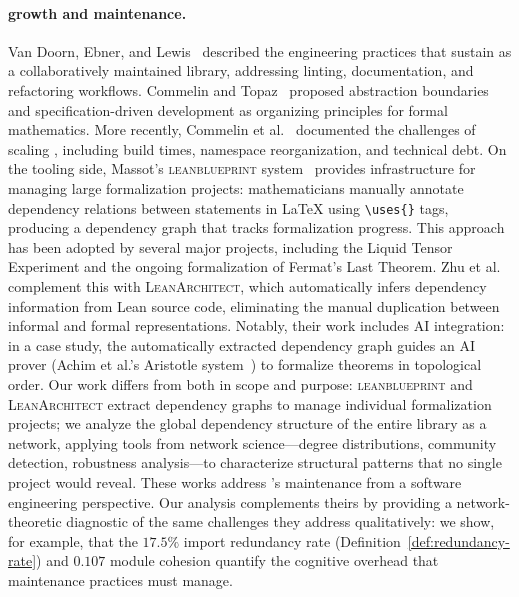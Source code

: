 \paragraph{ growth and maintenance.}
Van Doorn, Ebner, and Lewis~\cite{vandoorn2020} described the engineering practices that sustain  as a collaboratively maintained library, addressing linting, documentation, and refactoring workflows. Commelin and Topaz~\cite{commelin2023} proposed abstraction boundaries and specification-driven development as organizing principles for formal mathematics. More recently, Commelin et al.~\cite{baanen2025} documented the challenges of scaling , including build times, namespace reorganization, and technical debt. On the tooling side, Massot's \textsc{leanblueprint} system~\cite{massot2020leanblueprint} provides infrastructure for managing large formalization projects: mathematicians manually annotate dependency relations between statements in \LaTeX{} using \verb|\uses{}| tags, producing a dependency graph that tracks formalization progress. This approach has been adopted by several major projects, including the Liquid Tensor Experiment and the ongoing formalization of Fermat's Last Theorem. Zhu et al.~\cite{zhu2025leanarchitect} complement this with \textsc{LeanArchitect}, which automatically infers dependency information from Lean source code, eliminating the manual duplication between informal and formal representations. Notably, their work includes AI integration: in a case study, the automatically extracted dependency graph guides an AI prover (Achim et al.'s Aristotle system~\cite{achim2025aristotle}) to formalize theorems in topological order. Our work differs from both in scope and purpose: \textsc{leanblueprint} and \textsc{LeanArchitect} extract dependency graphs to manage individual formalization projects; we analyze the global dependency structure of the entire  library as a network, applying tools from network science---degree distributions, community detection, robustness analysis---to characterize structural patterns that no single project would reveal. These works address 's maintenance from a software engineering perspective. Our analysis complements theirs by providing a network-theoretic diagnostic of the same challenges they address qualitatively: we show, for example, that the $17.5\%$ import redundancy rate (Definition~\ref{def:redundancy-rate}) and $0.107$ module cohesion quantify the cognitive overhead that maintenance practices must manage.


